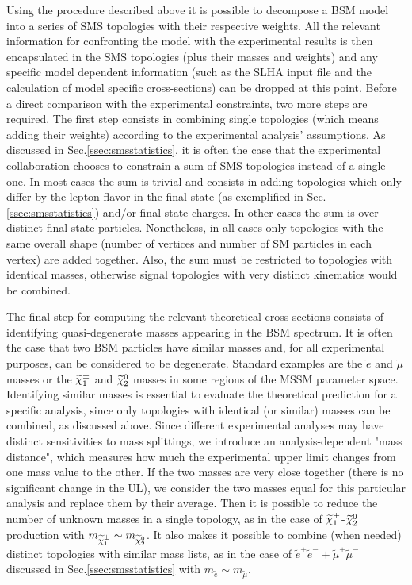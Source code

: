 Using the procedure described above it is possible to decompose a BSM model into
a series of SMS topologies with their respective weights. All the relevant information
for confronting the model with the experimental results is then encapsulated in the SMS
topologies (plus their masses and weights) and any specific model dependent information (such as the
SLHA input file and the calculation of model specific cross-sections) can be dropped at this point.
Before a direct comparison with the experimental constraints, two more steps are required.
The first step consists in combining single topologies (which means adding their weights)
according to the experimental analysis' assumptions. As discussed in Sec.\ref{ssec:smsstatistics}, 
it is often the case that the experimental collaboration chooses to constrain
a sum of SMS topologies instead of a single one.
In most cases the sum is trivial and consists in adding topologies which only differ by the
lepton flavor in the final state (as exemplified in Sec.\ref{ssec:smsstatistics}) and/or final state charges.
In other cases the sum is over distinct final state particles. Nonetheless, in all cases only topologies with the same
overall shape (number of vertices and number of SM particles in each vertex) are added together. 
Also, the sum must be restricted to topologies
with identical masses, otherwise signal topologies with very distinct kinematics would be
combined. 

The final step for computing the relevant theoretical cross-sections consists of identifying quasi-degenerate masses appearing in the BSM spectrum.
It is often the case that two BSM particles have similar masses and, for all experimental purposes, 
can be considered to be degenerate. Standard examples are the $\tilde{e}$ and $\tilde{\mu}$ masses
or the $\widetilde{\chi}^\pm_1$ and $\widetilde{\chi}^0_2$ masses in some regions of the MSSM parameter space.
Identifying similar masses is essential to evaluate the theoretical prediction
for a specific analysis, since only topologies with identical (or similar) masses can be combined, as discussed above.
Since different experimental analyses may have distinct sensitivities to mass splittings,
we introduce an analysis-dependent "mass distance", which measures how much the experimental 
upper limit changes from one mass value to the other.
If the two masses are very close together (there is no significant change in the UL),
we consider the two masses equal for this particular analysis and replace them by their average.
Then it is possible to reduce the number of unknown masses in a single topology, as in the case
of $\widetilde{\chi}^\pm_1$-$\widetilde{\chi}^0_2$ production with $m_{\widetilde{\chi}^\pm_1} \sim m_{\widetilde{\chi}^0_2}$. It also makes it possible to combine (when needed) distinct topologies
with similar mass lists, as in the case of $\tilde{e}^+\tilde{e}^- + \tilde{\mu}^+\tilde{\mu}^-$ discussed in Sec.\ref{ssec:smsstatistics}
with $m_{\tilde{e}} \sim m_{\tilde{\mu}}$.



